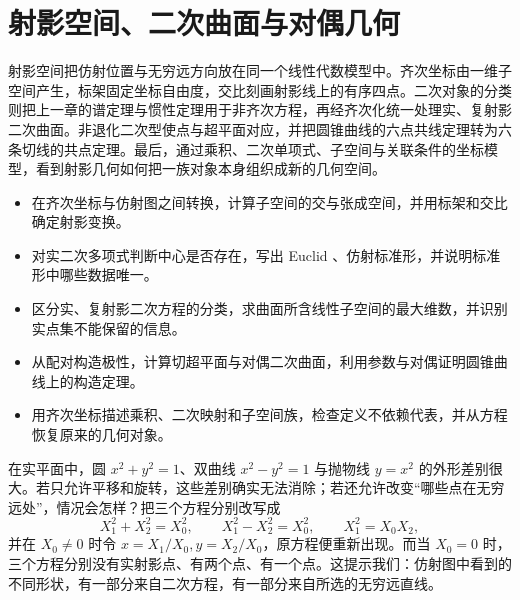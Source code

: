 
% 
% 

\chapter{射影空间、二次曲面与对偶几何}
\label{g1:ch:02}

\begin{chapterabstract}
	射影空间把仿射位置与无穷远方向放在同一个线性代数模型中。齐次坐标由一维子空间产生，标架固定坐标自由度，交比刻画射影线上的有序四点。二次对象的分类则把上一章的谱定理与惯性定理用于非齐次方程，再经齐次化统一处理实、复射影二次曲面。非退化二次型使点与超平面对应，并把圆锥曲线的六点共线定理转为六条切线的共点定理。最后，通过乘积、二次单项式、子空间与关联条件的坐标模型，看到射影几何如何把一族对象本身组织成新的几何空间。
\end{chapterabstract}

\begin{learninggoals}
	\begin{itemize}
		\item 在齐次坐标与仿射图之间转换，计算子空间的交与张成空间，并用标架和交比确定射影变换。
		\item 对实二次多项式判断中心是否存在，写出 Euclid 、仿射标准形，并说明标准形中哪些数据唯一。
		\item 区分实、复射影二次方程的分类，求曲面所含线性子空间的最大维数，并识别实点集不能保留的信息。
		\item 从配对构造极性，计算切超平面与对偶二次曲面，利用参数与对偶证明圆锥曲线上的构造定理。
		\item 用齐次坐标描述乘积、二次映射和子空间族，检查定义不依赖代表，并从方程恢复原来的几何对象。
	\end{itemize}
\end{learninggoals}

在实平面中，圆 \(x^2+y^2=1\)、双曲线 \(x^2-y^2=1\) 与抛物线 \(y=x^2\) 的外形差别很大。若只允许平移和旋转，这些差别确实无法消除；若还允许改变“哪些点在无穷远处”，情况会怎样？把三个方程分别改写成
\[
	X_1^2+X_2^2=X_0^2,\qquad
	X_1^2-X_2^2=X_0^2,\qquad
	X_1^2=X_0X_2,
\]
并在 \(X_0\ne0\) 时令 \(x=X_1/X_0,y=X_2/X_0\)，原方程便重新出现。而当 \(X_0=0\) 时，三个方程分别没有实射影点、有两个点、有一个点。这提示我们：仿射图中看到的不同形状，有一部分来自二次方程，有一部分来自所选的无穷远直线。

